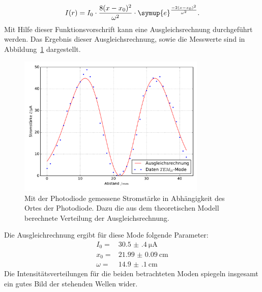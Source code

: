%
\begin{equation}
  I(r)=I_0\cdot\frac{8(x-x_0)^2}{\omega^2}\cdot\symup{e}^{\frac{-2(x-x_0)^2}{\omega^2}}. %
\end{equation}
%
Mit Hilfe dieser Funktionsvorschrift kann eine Ausgleichsrechnung durchgeführt werden. Das Ergebnis dieser Ausgleichsrechnung, sowie die Messwerte sind in Abbildung~\ref{fig:tem10} dargestellt.
%
\begin{figure}[h]
  \centering
  \includegraphics[width=0.8\textwidth]{auswertung/plot_Mode10.pdf}
  \caption{Mit der Photodiode gemessene Stromstärke in Abhängigkeit des Ortes der Photodiode. Dazu die aus dem theoretischen Modell berechnete Verteilung der Ausgleichsrechnung.}
  \label{fig:tem10}
\end{figure}
%
Die Ausgleichrechnung ergibt für diese Mode folgende Parameter:
%
\begin{align*}
  I_0=&\SI{30.5(4)}{\micro\ampere} \\
  x_0=&\SI{21.99(9)}{\centi\meter} \\
  \omega=&\SI{14.9(1)}{\centi\meter}
\end{align*}
%
Die Intensitätsverteilungen für die beiden betrachteten Moden spiegeln insgesamt ein gutes Bild der stehenden Wellen wider.

%

